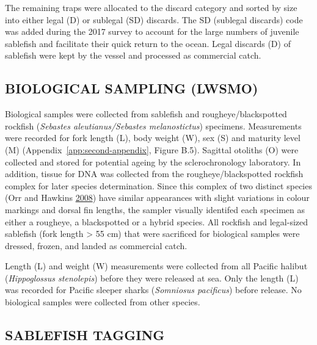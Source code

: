 \documentclass[12pt]{article}\usepackage[]{graphicx}\usepackage[]{color}
\begin{document}
The remaining traps were allocated to the discard category and sorted by size into either legal (D) or sublegal (SD) discards. The SD (sublegal discards) code was added during the 2017 survey to account for the large numbers of juvenile sablefish and facilitate their quick return to the ocean. Legal discards (D) of sablefish were kept by the vessel and processed as commercial catch.

\hypertarget{biological-sampling-lwsmo}{%
\subsection{BIOLOGICAL SAMPLING (LWSMO)}\label{biological-sampling-lwsmo}}

Biological samples were collected from sablefish and rougheye/blackspotted rockfish (\emph{Sebastes aleutianus/Sebastes melanostictus}) specimens. Measurements were recorded for fork length (L), body weight (W), sex (S) and maturity level (M) (Appendix~\ref{app:second-appendix}, Figure B.5). Sagittal otoliths (O) were collected and stored for potential ageing by the sclerochronology laboratory. In addition, tissue for DNA was collected from the rougheye/blackspotted rockfish complex for later species determination. Since this complex of two distinct species (Orr and Hawkins \protect\hyperlink{ref-Orr2008}{2008}) have similar appearances with slight variations in colour markings and dorsal fin lengths, the sampler visually identifed each specimen as either a rougheye, a blackspotted or a hybrid species. All rockfish and legal-sized sablefish (fork length \textgreater{} 55 cm) that were sacrificed for biological samples were dressed, frozen, and landed as commercial catch.

Length (L) and weight (W) measurements were collected from all Pacific halibut (\emph{Hippoglossus stenolepis}) before they were released at sea. Only the length (L) was recorded for Pacific sleeper sharks (\emph{Somniosus pacificus}) before release. No biological samples were collected from other species.

\hypertarget{sablefish-tagging}{%
\subsection{SABLEFISH TAGGING}\label{sablefish-tagging}}
\end{document}
